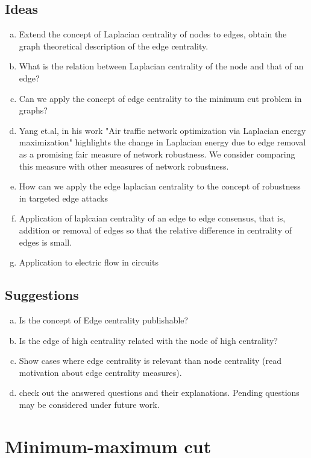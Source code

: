 \documentclass[10pt,a4paper]{article}
\begin{document}
	\subsection{Ideas}
	\begin{enumerate}[a)]
		\item Extend the concept of Laplacian centrality of  nodes to edges, obtain the graph theoretical description of the edge centrality.
		\item What is the relation between Laplacian centrality of the node and that of an edge?
		\item Can we apply the concept of edge centrality to the minimum cut problem in graphs?
		\item Yang et.al, in his work "Air traffic network optimization via Laplacian energy maximization" highlights the change in Laplacian energy due to edge removal as a promising fair measure of network robustness. We consider comparing this measure with other measures of network robustness.
		\item How can we apply the edge laplacian centrality to the concept of robustness in targeted edge attacks
		\item Application of laplcaian centrality of an edge to edge consensus, that is, addition or removal of edges so that the relative difference in centrality of edges is small.
		\item Application to electric flow in circuits
	\end{enumerate}

	\subsection{Suggestions}
	
	\begin{enumerate}[a)]
		\item  Is the concept of Edge centrality publishable?
		\item Is the edge of high centrality related with the node of high centrality?
		\item Show cases where edge centrality is relevant than node centrality (read motivation about edge centrality measures).
		\item check out the answered questions and their explanations. Pending questions may be considered under future work.
	\end{enumerate}
	
	\section{Minimum-maximum cut}
\end{document}
